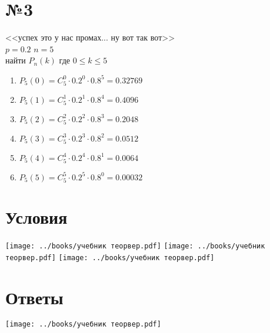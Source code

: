 \documentclass{article}
\newcommand{\hr}{\par\vspace{.5\baselineskip}\noindent\hrulefill\par}
\begin{document}
  \section*{№3}
  <<успех это у нас промах... ну вот так вот>> \\
  $p = 0.2$ \qquad $n=5$ \\
  найти $P_n(k)$ где $0 \leq k \leq 5$

  \begin{enumerate}
    \item $P_5(0) = C^0_5 \cdot 0.2^0 \cdot 0.8^5 = 0.32769$
    \item $P_5(1) = C^1_5 \cdot 0.2^1 \cdot 0.8^4 = 0.4096$
    \item $P_5(2) = C^2_5 \cdot 0.2^2 \cdot 0.8^3 = 0.2048$
    \item $P_5(3) = C^3_5 \cdot 0.2^3 \cdot 0.8^2 = 0.0512$
    \item $P_5(4) = C^4_5 \cdot 0.2^4 \cdot 0.8^1 = 0.0064$
    \item $P_5(5) = C^5_5 \cdot 0.2^5 \cdot 0.8^0 = 0.00032$
  \end{enumerate}

  \begin{center}
  \end{center}


  \hr
  \section*{Условия}
  \texttt{[image: ../books/учебник теорвер.pdf]} \hfill
  \texttt{[image: ../books/учебник теорвер.pdf]} \hfill
  \texttt{[image: ../books/учебник теорвер.pdf]} \hfill

  \section*{Ответы}
  \texttt{[image: ../books/учебник теорвер.pdf]}
\end{document}

